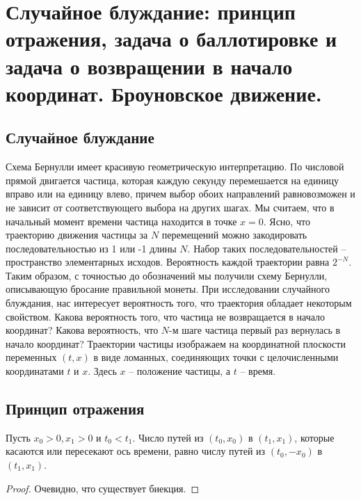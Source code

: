 \section{Случайное блуждание: принцип отражения, задача о баллотировке и задача о возвращении в начало координат. Броуновское движение.}

\subsection{Случайное блуждание}
Схема Бернулли имеет красивую геометрическую интерпретацию.
По числовой прямой двигается частица, которая каждую секунду перемешается на единицу вправо или на единицу влево, причем выбор обоих направлений равновозможен и не зависит от соответствующего выбора на других шагах. Мы считаем, что в начальный момент времени частица находится в точке $x = 0$. Ясно, что траекторию движения частицы за $N$ перемещений можно закодировать последовательностью из 1 или -1 длины $N$. Набор таких последовательностей -- пространство элементарных исходов. Вероятность каждой траектории равна $2^{-N}$. Таким образом, с точностью до обозначений мы получили схему Бернулли, описывающую бросание правильной монеты.
\newline
При исследовании случайного блуждания, нас интересует вероятность того, что траектория обладает некоторым свойством. Какова вероятность того, что частица не возвращается в начало координат? Какова вероятность, что $N$-м шаге частица первый раз вернулась в начало координат?
\newline
Траектории частицы изображаем на координатной плоскости переменных $(t, x)$ в виде ломанных, соединяющих точки с целочисленными координатами $t$ и $x$. Здесь $x$ -- положение частицы, а $t$ -- время.
\subsection{Принцип отражения}
\begin{theorem}
    Пусть $x_0 > 0, x_1 > 0$ и $t_0 < t_1$. Число путей из $(t_0, x_0)$ в $(t_1, x_1)$, которые касаются или пересекают ось времени, равно числу путей из $(t_0, -x_0)$ в $(t_1, x_1)$.
    \begin{proof}
        Очевидно, что существует биекция.
    \end{proof}
\end{theorem}

